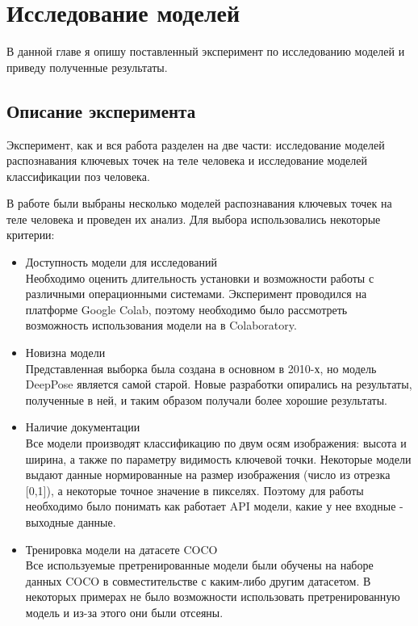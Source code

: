 \section{Исследование моделей}
\label{sec:Chapter4} 

В данной главе я опишу поставленный эксперимент по исследованию моделей и приведу полученные результаты.

\subsection{Описание эксперимента}

Эксперимент, как и вся работа разделен на две части: исследование моделей распознавания ключевых точек на теле человека и исследование моделей классификации поз человека.

В работе были выбраны несколько моделей распознавания ключевых точек на теле человека и проведен их анализ. Для выбора использовались некоторые критерии:

\begin{itemize}
	\item Доступность модели для исследований\\
	Необходимо оценить длительность установки и возможности работы с различными операционными системами. Эксперимент проводился на платформе Google Colab, поэтому необходимо было рассмотреть возможность использования модели на в Colaboratory.
	\item Новизна модели\\
	Представленная выборка была создана в основном в 2010-х, но модель DeepPose является самой старой. Новые разработки опирались на результаты, полученные в ней, и таким образом получали более хорошие результаты.
	\item Наличие документации\\
	Все модели производят классификацию по двум осям изображения: высота и ширина, а также по параметру видимость ключевой точки. Некоторые модели выдают данные нормированные на размер изображения (число из отрезка [0,1]), а некоторые точное значение в пикселях. Поэтому для работы необходимо было понимать как работает API модели, какие у нее входные - выходные данные.
	\item Тренировка модели на датасете COCO\\
	Все используемые претренированные модели были обучены на наборе данных COCO \cite{COCO_topology} в совместительстве с каким-либо другим датасетом. В некоторых  примерах не было возможности использовать претренированную модель и из-за этого они были отсеяны.
\end{itemize}

